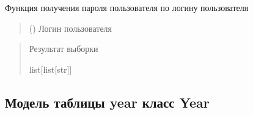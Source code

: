 \documentclass[letterpaper,10pt,russian]{sphinxmanual}
\begin{document}
\begin{fulllineitems}
\begin{fulllineitems}
\label{\detokenize{database.sqlite3_interface.tables:database.sqlite3_interface.tables.user.User.select_password_on_login}}
\pysigstartsignatures
{}
\pysigstopsignatures
\sphinxAtStartPar
Функция получения пароля пользователя по логину пользователя
\begin{quote}\begin{description}
\sphinxAtStartPar
{} () \textendash{} Логин пользователя

\end{description}\end{quote}
\begin{description}
\begin{sphinxVerbatim}[commandchars=\\\{\}]
\end{sphinxVerbatim}

\end{description}
\begin{quote}\begin{description}
\sphinxAtStartPar
Результат выборки

\sphinxAtStartPar
list{[}list{[}str{]}{]}

\end{description}\end{quote}

\end{fulllineitems}


\end{fulllineitems}



\subsection{Модель таблицы year \sphinxhyphen{} класс Year}
\label{\detokenize{database.sqlite3_interface.tables:module-database.sqlite3_interface.tables.year}}\label{\detokenize{database.sqlite3_interface.tables:year-year}}
\end{document}
